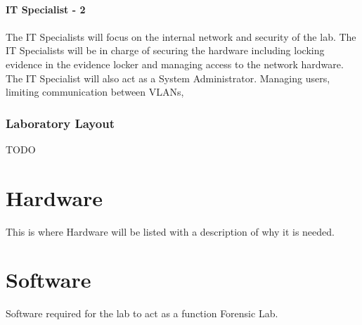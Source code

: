 \documentclass{article}
\begin{document}
\paragraph{IT Specialist - 2}
\paragraph{} The IT Specialists will focus on the internal network and security of the lab.  The IT Specialists will be in charge of securing the hardware including locking evidence in the evidence locker and managing access to the network hardware. The IT Specialist will also act as a System Administrator.  Managing users, limiting communication between VLANs,
\subsubsection{Laboratory Layout}
TODO


\section{Hardware}
This is where Hardware will be listed with a description of why it is needed.

\section{Software}
Software required for the lab to act as a function Forensic Lab.
\end{document}
